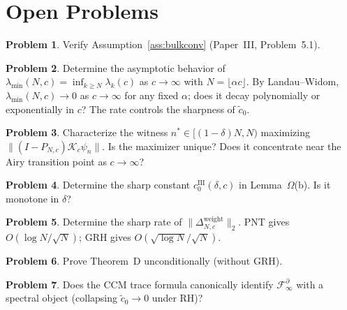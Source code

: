 \documentclass[12pt,a4paper]{amsart}
\theoremstyle{definition}
\newtheorem{problem}{Problem}[section]
\newcommand{\Kop}{\mathcal{K}_c}
\newcommand{\norm}[1]{\|#1\|}
\newcommand{\PN}{P_{N,c}}
\newcommand{\lmin}{\lambda_{\min}(N,c)}
\newcommand{\Flim}{\mathcal{F}_{\infty}}
\begin{document}
\section{Open Problems}\label{sec:open}

\begin{problem}\label{prob:bulkconv_verify}
Verify Assumption~\ref{ass:bulkconv} (Paper~III, Problem~5.1).
\end{problem}

\begin{problem}\label{prob:lmin_asymptotics}
Determine the asymptotic behavior of $\lmin = \inf_{k\ge N}\lambda_k(c)$
as $c\to\infty$ with $N = \lfloor\alpha c\rfloor$.
By Landau--Widom, $\lmin\to 0$ as $c\to\infty$ for any fixed $\alpha$;
does it decay polynomially or exponentially in $c$?
The rate controls the sharpness of $\tilde c_0$.
\end{problem}

\begin{problem}\label{prob:omega_nstar}
Characterize the witness $n^*\in[(1-\delta)N,N)$ maximizing
$\|(I-\PN)\Kop\psi_n\|$.
Is the maximizer unique? Does it concentrate near the Airy
transition point as $c\to\infty$?
\end{problem}

\begin{problem}\label{prob:omega_sharp}
Determine the sharp constant $c_0^{\mathrm{III}}(\delta,c)$
in Lemma~$\Omega$(b). Is it monotone in $\delta$?
\end{problem}

\begin{problem}\label{prob:weight_correction}
Determine the sharp rate of $\norm{\Delta_{N,c}^{\mathrm{weight}}}_2$.
PNT gives $O(\log N/\sqrt{N})$; GRH gives $O(\sqrt{\log N}/\sqrt{N})$.
\end{problem}

\begin{problem}\label{prob:nonrep_unconditional}
Prove Theorem~D unconditionally (without GRH).
\end{problem}

\begin{problem}\label{prob:ccm_repair}
Does the CCM trace formula \cite{CCM2025} canonically identify
$\Flim^{\partial}$ with a spectral object (collapsing $\tilde c_0\to 0$
under RH)?
\end{problem}
\end{document}
